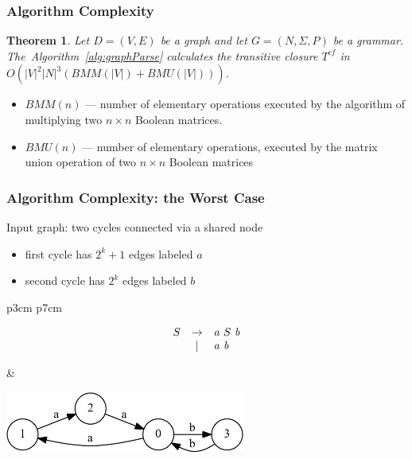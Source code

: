 \documentclass[xcolor=table]{beamer}
\newtheorem{mytheorem}{Theorem}
\begin{document}
\begin{frame}
  \transwipe[direction=90]
  \frametitle{Algorithm Complexity}
\begin{mytheorem}
 Let $D = (V,E)$ be a graph and let $G =(N,\Sigma,P)$ be a grammar. The~Algorithm~\ref{alg:graphParse} calculates the transitive closure $T^{cf}$ in $O(|V|^2|N|^3(BMM(|V|) + BMU(|V|)))$.
\end{mytheorem}

\begin{itemize}
  \item $BMM(n)$ --- number of elementary operations executed by the
algorithm of multiplying two $n \times n$ Boolean matrices.
  \item $BMU(n)$ --- number of elementary operations, executed by the matrix union
operation of two $n \times n$ Boolean matrices
\end{itemize}

\end{frame}
       

\begin{frame}[fragile]
  \transwipe[direction=90]
  \frametitle{Algorithm Complexity: the Worst Case}



Input graph: two cycles connected via a shared node

\begin{itemize}
    \item first cycle has $2^k + 1$ edges labeled $a$
    \item second cycle has $2^k$ edges labeled $b$
\end{itemize}


\begin{tabular}{p{3cm} p{7cm} }
\begin{figure}[h]
    \[
    \begin{array}{ccl}
    S & \rightarrow & \text{\emph{a}} \ S \ \text{\emph{b}} \\
      & |           & \text{\emph{a}} \ \text{\emph{b}} \\ 
    \end{array}
    \]
    
\end{figure}

& 

\begin{center}
  \includegraphics[height=2cm]{pictures/example_graph.pdf}
\end{center}
  \end{tabular}
\end{frame}       
       
\end{document}
